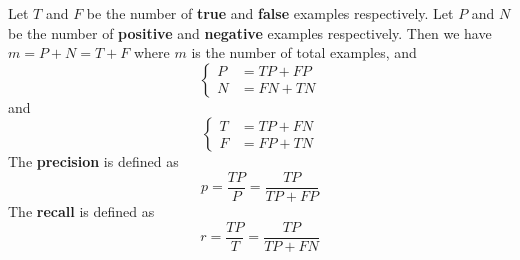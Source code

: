 Let $T$ and $F$ be the number of \textbf{true} and \textbf{false} examples respectively. Let $P$ and $N$ be
the number of \textbf{positive} and \textbf{negative} examples respectively. Then we have $m = P + N = T + F$
where $m$ is the number of total examples, and
\begin{equation}
    \begin{cases}
        P &= TP + FP\\
        N &= FN + TN
    \end{cases}
\end{equation}
and
\begin{equation}
    \begin{cases}
        T &= TP + FN\\
        F &= FP + TN
    \end{cases}
\end{equation}
The \textbf{precision} is defined as
\begin{equation}
    p = \frac{TP}{P} = \frac{TP}{TP + FP}
\end{equation}
The \textbf{recall} is defined as
\begin{equation}
    r = \frac{TP}{T} = \frac{TP}{TP + FN}
\end{equation}

